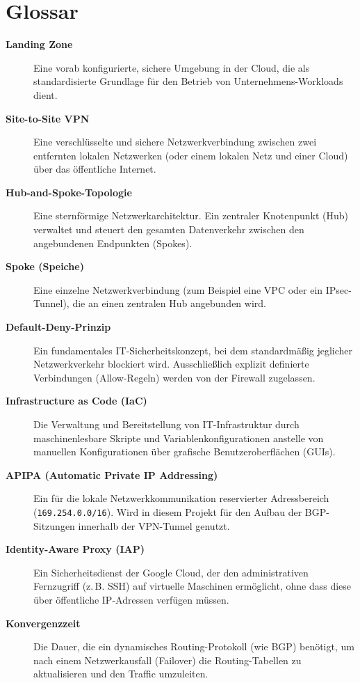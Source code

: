 \chapter*{Glossar}

\begin{description}
    \item[\textbf{Landing Zone}] Eine vorab konfigurierte, sichere Umgebung in der Cloud, die als standardisierte Grundlage für den Betrieb von Unternehmens-Workloads dient.
    
    \item[\textbf{Site-to-Site VPN}] Eine verschlüsselte und sichere Netzwerkverbindung zwischen zwei entfernten lokalen Netzwerken (oder einem lokalen Netz und einer Cloud) über das öffentliche Internet.
    
    \item[\textbf{Hub-and-Spoke-Topologie}] Eine sternförmige Netzwerkarchitektur. Ein zentraler Knotenpunkt (Hub) verwaltet und steuert den gesamten Datenverkehr zwischen den angebundenen Endpunkten (Spokes).
    
    \item[\textbf{Spoke (Speiche)}] Eine einzelne Netzwerkverbindung (zum Beispiel eine VPC oder ein IPsec-Tunnel), die an einen zentralen Hub angebunden wird.
    
    \item[\textbf{Default-Deny-Prinzip}] Ein fundamentales IT-Sicherheitskonzept, bei dem standardmäßig jeglicher Netzwerkverkehr blockiert wird. Ausschließlich explizit definierte Verbindungen (Allow-Regeln) werden von der Firewall zugelassen.
    
    \item[\textbf{Infrastructure as Code (IaC)}] Die Verwaltung und Bereitstellung von IT-Infrastruktur durch maschinenlesbare Skripte und Variablenkonfigurationen anstelle von manuellen Konfigurationen über grafische Benutzeroberflächen (GUIs).
    
    \item[\textbf{APIPA (Automatic Private IP Addressing)}] Ein für die lokale Netzwerkkommunikation reservierter Adressbereich (\texttt{169.254.0.0/16}). Wird in diesem Projekt für den Aufbau der BGP-Sitzungen innerhalb der VPN-Tunnel genutzt.
    
    \item[\textbf{Identity-Aware Proxy (IAP)}] Ein Sicherheitsdienst der Google Cloud, der den administrativen Fernzugriff (z.\,B. SSH) auf virtuelle Maschinen ermöglicht, ohne dass diese über öffentliche IP-Adressen verfügen müssen.
    
    \item[\textbf{Konvergenzzeit}] Die Dauer, die ein dynamisches Routing-Protokoll (wie BGP) benötigt, um nach einem Netzwerkausfall (Failover) die Routing-Tabellen zu aktualisieren und den Traffic umzuleiten.
\end{description}